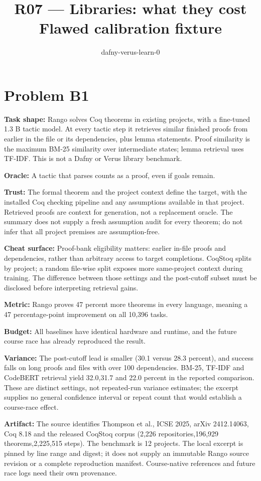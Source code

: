 \documentclass[11pt]{article}
\title{R07 --- Libraries: what they cost \\ \large Flawed calibration fixture}
\author{dafny-verus-learn-0}
\date{}
\begin{document}
\maketitle
\section*{Problem B1}\label{ans:B1}
\begin{answer}
\textbf{Task shape:} Rango solves Coq theorems in existing projects, with a fine-tuned 1.3 B tactic model. At every tactic step it retrieves similar finished proofs from earlier in the file or its dependencies, plus lemma statements. Proof similarity is the maximum BM-25 similarity over intermediate states; lemma retrieval uses TF-IDF. This is not a Dafny or Verus library benchmark.

\textbf{Oracle:} A tactic that parses counts as a proof, even if goals remain.

\textbf{Trust:} The formal theorem and the project context define the target, with the installed Coq checking pipeline and any assumptions available in that project. Retrieved proofs are context for generation, not a replacement oracle. The summary does not supply a fresh assumption audit for every theorem; do not infer that all project premises are assumption-free.

\textbf{Cheat surface:} Proof-bank eligibility matters: earlier in-file proofs and dependencies, rather than arbitrary access to target completions. CoqStoq splits by project; a random file-wise split exposes more same-project context during training. The difference between those settings and the post-cutoff subset must be disclosed before interpreting retrieval gains.

\textbf{Metric:} Rango proves 47 percent more theorems in every language, meaning a 47 percentage-point improvement on all 10,396 tasks.

\textbf{Budget:} All baselines have identical hardware and runtime, and the future course race has already reproduced the result.

\textbf{Variance:} The post-cutoff lead is smaller (30.1 versus 28.3 percent), and success falls on long proofs and files with over 100 dependencies. BM-25, TF-IDF and CodeBERT retrieval yield 32.0,31.7 and 22.0 percent in the reported comparison. These are distinct settings, not repeated-run variance estimates; the excerpt supplies no general confidence interval or repeat count that would establish a course-race effect.

\textbf{Artifact:} The source identifies Thompson et al., ICSE 2025, arXiv 2412.14063, Coq 8.18 and the released CoqStoq corpus (2,226 repositories,196,929 theorems,2,225,515 steps). The benchmark is 12 projects. The local excerpt is pinned by line range and digest; it does not supply an immutable Rango source revision or a complete reproduction manifest. Course-native references and future race logs need their own provenance.
\end{answer}
\end{document}
